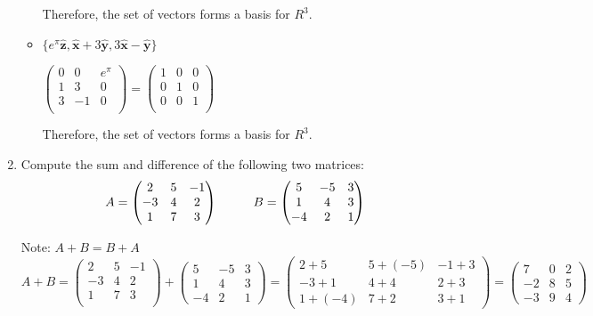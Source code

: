 \documentclass[fleqn]{article}
\begin{document}
\begin{enumerate}
\begin{itemize}
  Therefore, the set of vectors forms a basis for $R^3$.
  
  \item $\{ e^\pi \mathbf{\hat{z}}, \mathbf{\hat{x}}+3\mathbf{\hat{y}}, 3\mathbf{\hat{x}}-\mathbf{\hat{y}}\}$
  
  \noindent
  $\displaystyle
    \begin{pmatrix}
      0 & 0 & e^\pi \\
      1 & 3 & 0 \\ 
      3 & -1 & 0 \\ 
    \end{pmatrix}
    =
    \begin{pmatrix}
      1 & 0 & 0 \\
      0 & 1 & 0 \\ 
      0 & 0 & 1 \\ 
    \end{pmatrix}
  $
  
  Therefore, the set of vectors forms a basis for $R^3$.
  \end{itemize}
  
  
  \item  Compute the sum and difference of the following two matrices:
  $$A=\begin{pmatrix}
  2 & 5 & -1 \\
  -3 & 4 & 2 \\
  1 & 7 & 3
  \end{pmatrix} \hskip 1truecm B=\begin{pmatrix}
  5 & -5 & 3 \\
  1 & 4 & 3 \\
  -4 & 2 & 1
  \end{pmatrix}$$ 
  
  Note: $A+B=B+A$
  \\
  \noindent
  $A+B=
  \begin{pmatrix}
      2 & 5 & -1 \\
      -3 & 4 & 2 \\ 
      1 & 7 & 3 \\ 
  \end{pmatrix}
  +
  \begin{pmatrix}
    5 & -5 & 3 \\
    1 & 4 & 3 \\
    -4 & 2 & 1
  \end{pmatrix}
  =
  \begin{pmatrix}
    2+5 & 5+(-5) & -1+3 \\
    -3+1 & 4+4 & 2+3 \\
    1+(-4) & 7+2 & 3+1
  \end{pmatrix}
  =
  \begin{pmatrix}
    7 & 0 & 2 \\
    -2 & 8 & 5 \\
    -3 & 9 & 4
  \end{pmatrix}
  $
  

\end{enumerate}
\end{document}
